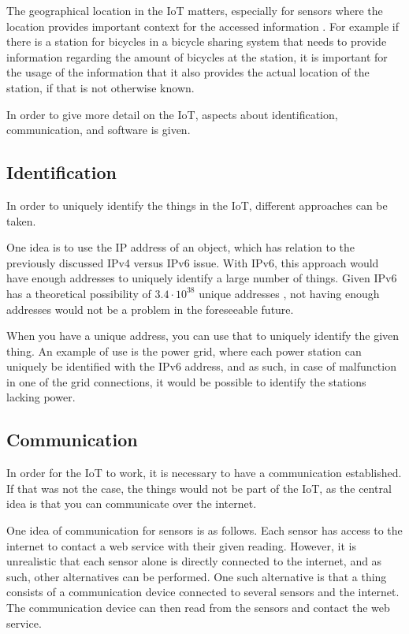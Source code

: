 The geographical location in the IoT matters, especially for sensors where the location provides important context for the accessed information \citep{misc:locationMatters}.
For example if there is a station for bicycles in a bicycle sharing system that needs to provide information regarding the amount of bicycles at the station, it is important for the usage of the information that it also provides the actual location of the station, if that is not otherwise known.

In order to give more detail on the IoT, aspects about identification, communication, and software is given.

\subsection{Identification}
In order to uniquely identify the things in the IoT, different approaches can be taken.

One idea is to use the IP address of an object, which has relation to the previously discussed IPv4 versus IPv6 issue.
With IPv6, this approach would have enough addresses to uniquely identify a large number of things.
Given IPv6 has a theoretical possibility of $3.4 \cdot 10^{38}$ unique addresses \citep{misc:ipv6}, not having enough addresses would not be a problem in the foreseeable future.

When you have a unique address, you can use that to uniquely identify the given thing.
An example of use is the power grid, where each power station can uniquely be identified with the IPv6 address, and as such, in case of malfunction in one of the grid connections, it would be possible to identify the stations lacking power.

\subsection{Communication}
In order for the IoT to work, it is necessary to have a communication established.
If that was not the case, the things would not be part of the IoT, as the central idea is that you can communicate over the internet.

One idea of communication for sensors is as follows.
Each sensor has access to the internet to contact a web service with their given reading.
However, it is unrealistic that each sensor alone is directly connected to the internet, and as such, other alternatives can be performed.
One such alternative is that a thing consists of a communication device connected to several sensors and the internet.
The communication device can then read from the sensors and contact the web service.

